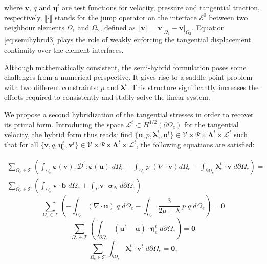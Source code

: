 \documentclass[english,11pt,3p,number,sort&compress]{elsarticle}
\begin{document}
\noindent where $\mathbf{v}$, $q$ and $\boldsymbol{\eta}^t$ are test functions for velocity, pressure and tangential traction, respectively, $\llbracket \cdot \rrbracket$ stands for the jump operator on the interface $\mathcal{E}^0$ between two neighbour elements $\Omega_1$ and $\Omega_2$, defined as $\llbracket \mathbf{v} \rrbracket = \mathbf{v} \vert_{\Omega_1} - \mathbf{v} \vert_{\Omega_2}$. Equation \eqref{eq:semihybrid3} plays the role of weakly enforcing the tangential displacement continuity over the element interfaces.

Although mathematically consistent, the semi-hybrid formulation poses some challenges from a numerical perspective. It gives rise to a saddle-point problem with two different constraints: $p$ and $\boldsymbol{\lambda}^t$. This structure significantly increases the efforts required to consistently and stably solve the linear system.

We propose a second hybridization of the tangential stresses in order to recover its primal form. Introducing the space $\mathcal{L}^t \subset H^{1/2}(\partial\Omega_e)$ for the tangential velocity, the hybrid form thus reads: find $\{\mathbf{u},p,\boldsymbol{\lambda}^t_e,\mathbf{u}^t\} \in \mathcal{V} \times \Psi \times \boldsymbol{\Lambda}^t \times \mathcal{L}^t$ such that for all $\{\mathbf{v},q,\boldsymbol{\eta}^t_e,\mathbf{v}^t\} \in \mathcal{V} \times \Psi \times \boldsymbol{\Lambda}^t\times \mathcal{L}^t$, the following equations are satisfied:

\begin{equation} \label{eq:hybrid1}
    \begin{split}
        \sum_{\Omega_e \in \mathcal{T}} \left( \int_{\Omega_e} \boldsymbol{\varepsilon}(\mathbf{v}) : \mathcal{D}^{'} : \boldsymbol{\varepsilon}(\mathbf{u})\; d\Omega_e - \int_{\Omega_e} p \;(\nabla \cdot \mathbf{v}) d\Omega_e - \int_{\partial\Omega_e} \boldsymbol{\lambda}^t_e \cdot \mathbf{v}\; d\partial\Omega_e \right) = \\ \sum_{\Omega_e \in \mathcal{T}} \left( \int_{\Omega_e} \mathbf{v} \cdot \mathbf{b} \;d\Omega_e + \int_{\Gamma} \mathbf{v} \cdot \boldsymbol{\sigma}_N\; d\partial\Omega_e \right)
    \end{split}
\end{equation}
\begin{equation} \label{eq:hybrid2}
    \sum_{\Omega_e \in \mathcal{T}} \left(-\int_{\Omega_e} (\nabla \cdot \mathbf{u})\; q \;d\Omega_e -\int_{\Omega_e} \frac{3}{2\mu+\lambda}\;p \;q \;d\Omega_e \right) = \mathbf{0}
\end{equation}
\begin{equation} \label{eq:hybrid3}
    \sum_{\Omega_e \in \mathcal{T}} \left(\int_{\partial\Omega_e} (\mathbf{u}^t-\mathbf{u}) \cdot \boldsymbol{\eta}^t_e\; d\partial\Omega_e \right)  = \mathbf{0}
\end{equation}
\begin{equation} \label{eq:hybrid4}
    \sum_{\Omega_e \in \mathcal{T}} \int_{\partial\Omega_e} \boldsymbol{\lambda}^t_e \cdot \mathbf{v}^t\; d\partial\Omega_e = \mathbf{0} \text{,}
\end{equation}
\end{document}
